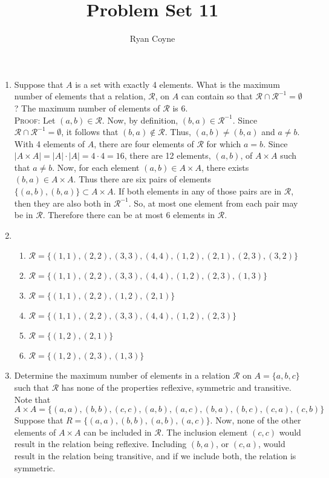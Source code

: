\documentclass[12pt]{article}
\newcommand{\mc}[1]{\mathcal{#1}}
\begin{document}
    \title{Problem Set 11}
    \author{Ryan Coyne}
    \date{}
    \maketitle

    \begin{enumerate}
        \item Suppose that \(A\) is a set with exactly 4 elements. What is the maximum number of elements that a relation, \(\mathcal{R}\), on \(A\) can contain so that \(\mathcal{R} \cap \mathcal{R}^{-1} = \emptyset\)? The maximum number of elements of \(\mathcal{R}\) is 6.\\ \textsc{Proof:} Let \((a,b)\in \mc{R}\). Now, by definition, \((b,a) \in \mc{R}^{-1}\). Since \(\mc{R}\cap\mc{R}^{-1}=\emptyset\), it follows that \((b,a)\not\in\mc R\). Thus, \((a,b)\neq(b,a)\) and \(a\neq b\). With 4 elements of \(A\), there are four elements of \(\mc R\) for which \(a=b\). Since \(|A\times A| = |A|\cdot|A| = 4\cdot4 = 16\), there are 12 elements, \((a,b)\), of \(A\times A\) such that \(a \neq b\).  Now, for each element \((a,b)\in A\times A\), there exists \((b,a)\in A\times A\). Thus there are six pairs of elements \(\{(a,b), (b,a)\}\subset A\times A\). If both elements in any of those pairs are in \(\mc R\), then they are also both in \(\mc R^{-1}\). So, at most one element from each pair may be in \(\mc R\). Therefore there can be at most 6 elements in \(\mc R\).
        \item \begin{enumerate}
            \item \(\mc R = \{(1,1), (2,2), (3,3), (4,4), (1,2), (2,1), (2,3), (3,2)\}\)
            \item \(\mc R = \{(1,1), (2,2), (3,3), (4,4), (1,2), (2,3), (1,3)\}\)
            \item \(\mc R = \{(1,1), (2,2), (1,2), (2,1)\}\)
            \item \(\mc R = \{(1,1), (2,2), (3,3), (4,4), (1, 2), (2, 3)\}\)
            \item \(\mc R = \{(1,2), (2,1)\}\)
            \item \(\mc R = \{(1,2), (2,3), (1,3)\}\)
        \end{enumerate}
        \item Determine the maximum number of elements in a relation \(\mc R\) on \(A = \{a, b, c\}\) such that \(\mc R\) has none of the properties reflexive, symmetric and transitive. Note that \(A \times A  = \{(a, a), (b,b), (c,c), (a,b), (a,c), (b, a), (b,c), (c, a), (c,b)\}\) Suppose that \(R = \{(a, a), (b,b), (a,b), (a,c)\}\). Now, none of the other elements of \(A\times A\) can be included in \(\mc R\). The inclusion element \((c,c)\) would result in the relation being reflexive. Including \((b,a)\), or \((c, a)\), would result in the relation being transitive, and if we include both, the relation is symmetric. 

\end{enumerate}
\end{document}
